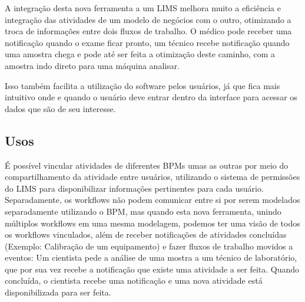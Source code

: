 
A integração desta nova ferramenta a um LIMS melhora muito a eficiência e integração das atividades de um modelo de negócios com o outro, otimizando a troca de informações entre dois fluxos de trabalho. O médico pode receber uma notificação quando o exame ficar pronto, um técnico recebe notificação quando uma amostra chega e pode até ser feita a otimização deste caminho, com a amostra indo direto para uma máquina analisar.

Isso também facilita a utilização do software pelos usuários, já que fica mais intuitivo onde e quando o usuário deve entrar dentro da interface para acessar os dados que são de seu interesse.


\subsection{Usos}

É possível vincular atividades de diferentes BPMs umas as outras por meio do compartilhamento da atividade entre usuários, utilizando o sistema de permissões do LIMS para disponibilizar informações pertinentes para cada usuário. Separadamente, os workflows não podem comunicar entre si por serem modelados separadamente utilizando o BPM, mas quando esta nova ferramenta, unindo múltiplos workflows em uma mesma modelagem, podemos ter uma visão de todos os workflows vinculados, além de receber notificações de atividades concluídas (Exemplo: Calibração de um equipamento) e fazer fluxos de trabalho movidos a eventos: Um cientista pede a análise de uma mostra a um técnico de laboratório, que por sua vez recebe a notificação que existe uma atividade a ser feita. Quando concluída, o cientista recebe uma notificação e uma nova atividade está disponibilizada para ser feita.